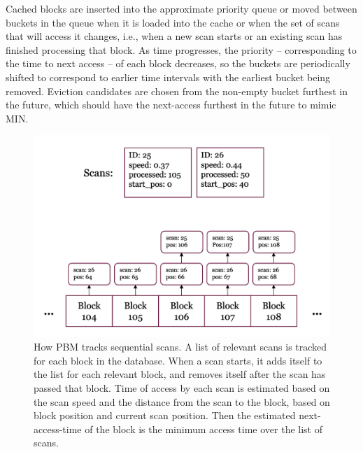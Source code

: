 Cached blocks are inserted into the approximate priority queue or moved between buckets in the queue when it is loaded into the cache or when the set of scans that will access it changes, i.e., when a new scan starts or an existing scan has finished processing that block. As time progresses, the priority -- corresponding to the time to next access -- of each block decreases, so the buckets are periodically shifted to correspond to earlier time intervals with the earliest bucket being removed. Eviction candidates are chosen from the non-empty bucket furthest in the future, which should have the next-access furthest in the future to mimic MIN.

\begin{figure}
    \centering
    \includegraphics[width=1\columnwidth]{figures/Diagrams/seq_scan_registered_progress.png}
    \caption[PBM sequential scan tracking]{How PBM tracks sequential scans. A list of relevant scans is tracked for each block in the database. When a scan starts, it adds itself to the list for each relevant block, and removes itself after the scan has passed that block. Time of access by each scan is estimated based on the scan speed and the distance from the scan to the block, based on block position and current scan position. Then the estimated next-access-time of the block is the minimum access time over the list of scans.}
    \label{fig:scan_tracking}
\end{figure}


